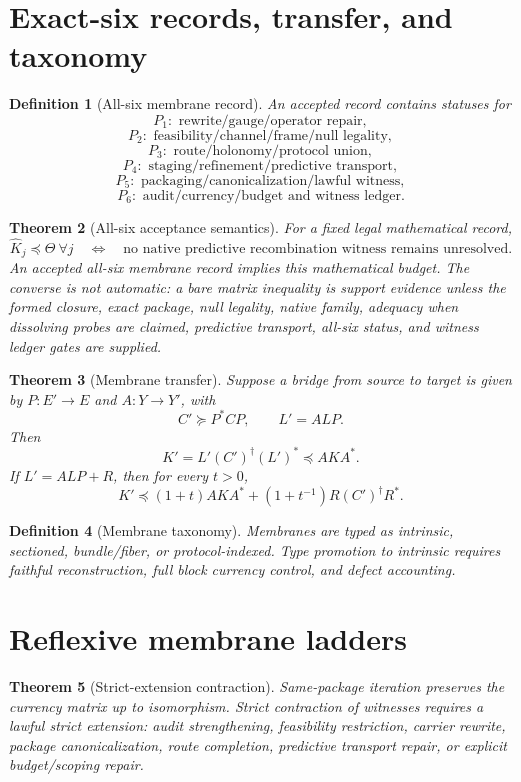 \documentclass[11pt]{article}
\newtheorem{theorem}{Theorem}[section]
\newtheorem{definition}[theorem]{Definition}
\newcommand{\Loewner}{\preceq}
\begin{document}
\section{Exact-six records, transfer, and taxonomy}

\begin{definition}[All-six membrane record]
An accepted record contains statuses for
\[
P_1:\text{ rewrite/gauge/operator repair},
\]
\[
P_2:\text{ feasibility/channel/frame/null legality},
\]
\[
P_3:\text{ route/holonomy/protocol union},
\]
\[
P_4:\text{ staging/refinement/predictive transport},
\]
\[
P_5:\text{ packaging/canonicalization/lawful witness},
\]
\[
P_6:\text{ audit/currency/budget and witness ledger}.
\]
\end{definition}

\begin{theorem}[All-six acceptance semantics]
For a fixed legal mathematical record,
\[
  \widehat K_j\Loewner\Theta\ \forall j
  \quad\Longleftrightarrow\quad
  \text{no native predictive recombination witness remains unresolved.}
\]
An accepted all-six membrane record implies this mathematical budget.  The converse is not automatic: a bare matrix inequality is support evidence unless the formed closure, exact package, null legality, native family, adequacy when dissolving probes are claimed, predictive transport, all-six status, and witness ledger gates are supplied.
\end{theorem}

\begin{theorem}[Membrane transfer]
Suppose a bridge from source to target is given by \(P:E'\to E\) and \(A:Y\to Y'\), with
\[
  C'\succeq P^*CP,
  \qquad
  L'=ALP.
\]
Then
\[
  K'=L'(C')^\dagger(L')^*\Loewner AK A^*.
\]
If \(L'=ALP+R\), then for every \(t>0\),
\[
  K'\Loewner(1+t)AKA^*+(1+t^{-1})R(C')^\dagger R^*.
\]
\end{theorem}

\begin{definition}[Membrane taxonomy]
Membranes are typed as intrinsic, sectioned, bundle/fiber, or protocol-indexed.  Type promotion to intrinsic requires faithful reconstruction, full block currency control, and defect accounting.
\end{definition}

\section{Reflexive membrane ladders}

\begin{theorem}[Strict-extension contraction]
Same-package iteration preserves the currency matrix up to isomorphism.  Strict contraction of witnesses requires a lawful strict extension: audit strengthening, feasibility restriction, carrier rewrite, package canonicalization, route completion, predictive transport repair, or explicit budget/scoping repair.
\end{theorem}
\end{document}
